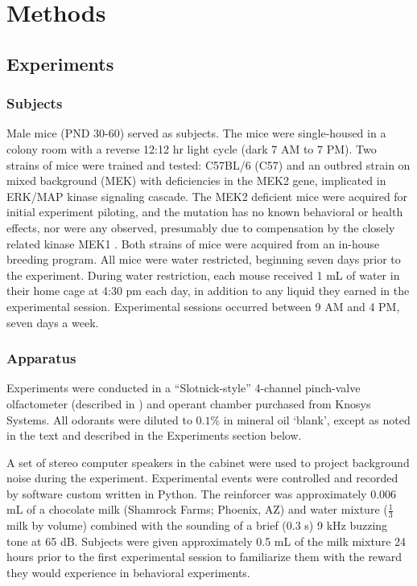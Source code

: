 \section*{Methods}
\label{sec:methods}
\subsection*{Experiments}

\subsubsection*{Subjects}
\label{sec:methods_subjects}
Male mice (PND 30-60) served as subjects. The mice were single-housed in a colony room with a reverse 12:12 hr light cycle (dark 7 AM to 7 PM). Two strains of mice were trained and tested: C57BL/6 (C57) and an outbred strain on mixed background (MEK) with deficiencies in the MEK2 gene, implicated in ERK/MAP kinase signaling cascade. The MEK2 deficient mice were acquired for initial experiment piloting, and the mutation has no known behavioral or health effects, nor were any observed, presumably due to compensation by the closely related kinase MEK1 \cite{12832465}. Both strains of mice were acquired from an in-house breeding program. All mice were water restricted, beginning seven days prior to the experiment. During water restriction, each mouse received 1 mL of water in their home cage at 4:30 pm each day, in addition to any liquid they earned in the experimental session. Experimental sessions occurred between 9 AM and 4 PM, seven days a week.

\subsubsection*{Apparatus}
\label{sec:methods_apparatus}
Experiments were conducted in a ``Slotnick-style'' 4-channel pinch-valve olfactometer (described in \cite{18428626}) and operant chamber purchased from Knosys Systems. All odorants were diluted to $0.1\%$ in mineral oil `blank', except as noted in the text and described in the Experiments section below.

A set of stereo computer speakers in the cabinet were used to project background noise during the experiment.  Experimental events were controlled and recorded by software custom written in Python. The reinforcer was approximately 0.006 mL of a chocolate milk (Shamrock Farms; Phoenix, AZ) and water mixture ($\frac{1}{3}$ milk by volume) combined with the sounding of a brief (0.3 s) 9 kHz buzzing tone at 65 dB. Subjects were given approximately 0.5 mL of the milk mixture 24 hours prior to the first experimental session to familiarize them with the reward they would experience in behavioral experiments.  

